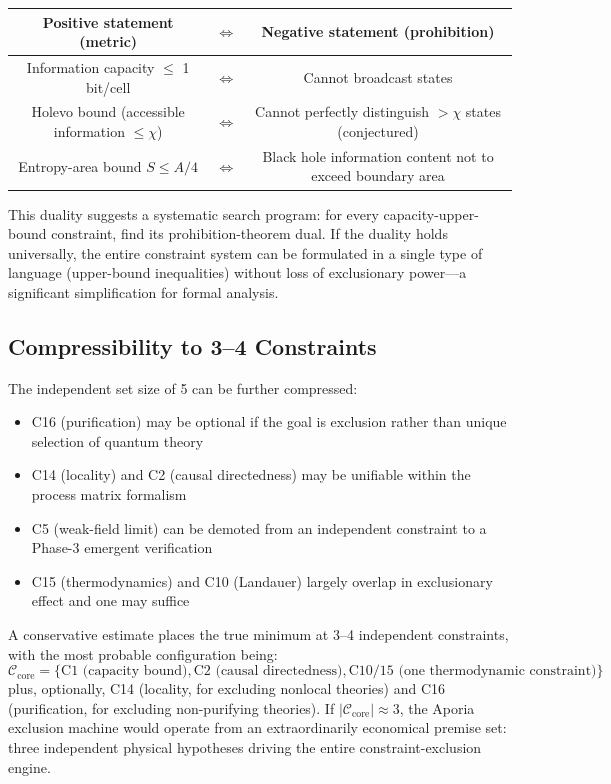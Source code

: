 \documentclass[12pt,a4paper]{article}
\theoremstyle{definition}
\theoremstyle{remark}
\begin{document}
\begin{center}
\begin{tabular}{ccc}
\toprule
\textbf{Positive statement (metric)} & $\Leftrightarrow$ & \textbf{Negative statement (prohibition)} \\
\midrule
Information capacity $\leq$ 1 bit/cell & $\Leftrightarrow$ & Cannot broadcast states \\
Holevo bound (accessible information $\leq \chi$) & $\Leftrightarrow$ & Cannot perfectly distinguish $>\chi$ states (conjectured) \\
Entropy-area bound $S \leq A/4$ & $\Leftrightarrow$ & Black hole information content not to exceed boundary area \\
\bottomrule
\end{tabular}
\end{center}

This duality suggests a systematic search program: for every capacity-upper-bound constraint, find its prohibition-theorem dual. If the duality holds universally, the entire constraint system can be formulated in a single type of language (upper-bound inequalities) without loss of exclusionary power---a significant simplification for formal analysis.

\subsection{Compressibility to 3--4 Constraints}

The independent set size of 5 can be further compressed:
\begin{itemize}[leftmargin=*,itemsep=0pt,topsep=0pt]
\item C16 (purification) may be optional if the goal is exclusion rather than unique selection of quantum theory
\item C14 (locality) and C2 (causal directedness) may be unifiable within the process matrix formalism~\cite{Oreshkov2012}
\item C5 (weak-field limit) can be demoted from an independent constraint to a Phase-3 emergent verification
\item C15 (thermodynamics) and C10 (Landauer) largely overlap in exclusionary effect and one may suffice
\end{itemize}

A conservative estimate places the true minimum at 3--4 independent constraints, with the most probable configuration being:
\begin{equation}
\mathcal{C}_{\mathrm{core}} = \{\text{C1 (capacity bound)}, \text{C2 (causal directedness)}, \text{C10/15 (one thermodynamic constraint)}\}
\end{equation}
plus, optionally, C14 (locality, for excluding nonlocal theories) and C16 (purification, for excluding non-purifying theories). If $|\mathcal{C}_{\mathrm{core}}| \approx 3$, the Aporia exclusion machine would operate from an extraordinarily economical premise set: three independent physical hypotheses driving the entire constraint-exclusion engine.
\end{document}
